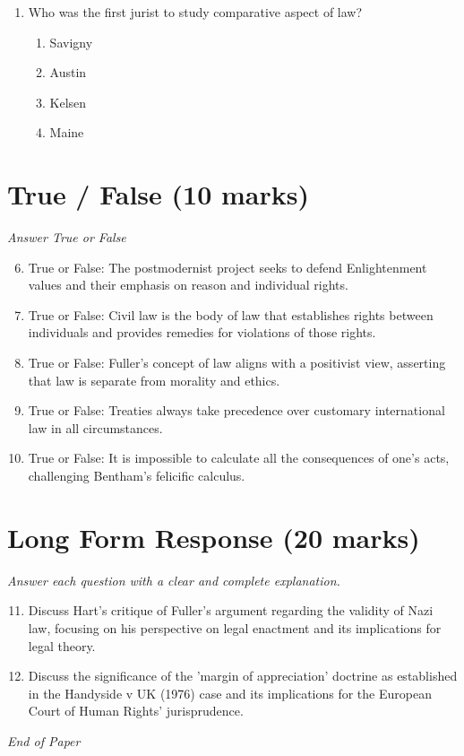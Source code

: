 \documentclass[12pt]{article}
\begin{document}
\begin{enumerate}[label=\arabic*.]
\begin{enumerate}[label=(\alph*)]
    \item Both are concerned with the 'law in action.'
    \item Both are anti-formalist and sceptical
    \item Both adopt a liberal ideology.
    \item Both attempt to demystify the law.
\end{enumerate}
\item Who was the first jurist to study comparative aspect of law?
\begin{enumerate}[label=(\alph*)]
    \item Savigny
    \item Austin
    \item Kelsen
    \item Maine
\end{enumerate}
\end{enumerate}

\section*{True / False (10 marks)}
\textit{Answer True or False}
\begin{enumerate}[label=\arabic*.]
\setcounter{enumi}{5}
\item True or False: The postmodernist project seeks to defend Enlightenment values and their emphasis on reason and individual rights.
\item True or False: Civil law is the body of law that establishes rights between individuals and provides remedies for violations of those rights.
\item True or False: Fuller's concept of law aligns with a positivist view, asserting that law is separate from morality and ethics.
\item True or False: Treaties always take precedence over customary international law in all circumstances.
\item True or False: It is impossible to calculate all the consequences of one's acts, challenging Bentham's felicific calculus.
\end{enumerate}

\section*{Long Form Response (20 marks)}
\textit{Answer each question with a clear and complete explanation.}
\begin{enumerate}[label=\arabic*.]
\setcounter{enumi}{10}
\item Discuss Hart's critique of Fuller's argument regarding the validity of Nazi law, focusing on his perspective on legal enactment and its implications for legal theory.
\item Discuss the significance of the 'margin of appreciation' doctrine as established in the Handyside v UK (1976) case and its implications for the European Court of Human Rights' jurisprudence.
\end{enumerate}

\vfill
\noindent\textit{End of Paper}
\end{document}
